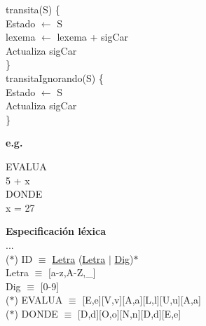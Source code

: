 \documentclass[\main/ApuntesPL.tex]{subfiles}
\begin{document}
      \vspace{10mm}
      \hspace{5mm}transita(S) \{\\
      \hspace{10mm}Estado $\leftarrow$ S\\
      \hspace{10mm}lexema $\leftarrow$ lexema + sigCar\\
      \hspace{10mm}Actualiza sigCar\\
      \hspace{5mm}\}\\
      \vspace{10mm}
      \hspace{5mm}transitaIgnorando(S) \{\\
      \hspace{10mm}Estado $\leftarrow$ S\\
      \hspace{10mm}Actualiza sigCar\\
      \hspace{5mm}\}

      \newpage
      \par
      \textbf{e.g.}
      \begin{center}
        \begin{minipage}{.2 \textwidth}
          EVALUA\\
          5 + x\\
          DONDE\\
          x = 27
        \end{minipage}%
        \begin{minipage}{.5 \textwidth}
          \par
          \textbf{Especificación léxica}\\
          \vspace{2mm}
          \hspace{5mm}...\\
          \hspace{5mm}($\ast$) ID $\equiv$ \underline{Letra} (\underline{Letra} $\mid$ \underline{Dig})$\ast$\\
          \hspace{11mm}Letra $\equiv$ $[$a-z,A-Z,\_]\\
          \hspace{11mm}Dig $\equiv$ $[$0-9]\\
          \hspace{5mm}($\ast$) EVALUA $\equiv$ [E,e][V,v][A,a][L,l][U,u][A,a]\\
          \hspace{5mm}($\ast$) DONDE $\equiv$ [D,d][O,o][N,n][D,d][E,e]\\
        \end{minipage}
      \end{center}
\end{document}
